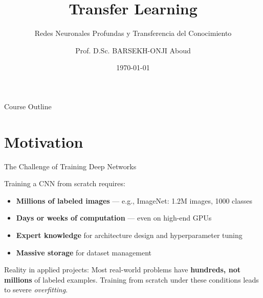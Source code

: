 \documentclass[aspectratio=169,xcolor=dvipsnames]{beamer}
\title{Transfer Learning}
\subtitle{Redes Neuronales Profundas y Transferencia del Conocimiento}
\author{Prof. D.Sc. BARSEKH-ONJI Aboud}
\institute{
    Facultad de Ingeniería \\
    Universidad Anáhuac México
}
\date{\today}
\begin{document}
\begin{frame}
    \titlepage
\end{frame}

\begin{frame}{Course Outline}
    \tableofcontents
\end{frame}

\section{Motivation}

\begin{frame}{The Challenge of Training Deep Networks}
    \begin{alertblock}{Training a CNN from scratch requires:}
        \begin{itemize}
            \item \textbf{Millions of labeled images} — e.g., ImageNet: 1.2M images, 1000 classes
            \item \textbf{Days or weeks of computation} — even on high-end GPUs
            \item \textbf{Expert knowledge} for architecture design and hyperparameter tuning
            \item \textbf{Massive storage} for dataset management
        \end{itemize}
    \end{alertblock}
    \vspace{0.3cm}
    \begin{block}{Reality in applied projects:}
        Most real-world problems have \textbf{hundreds, not millions} of labeled examples.
        Training from scratch under these conditions leads to severe \textit{overfitting}.
    \end{block}
\end{frame}
\end{document}
